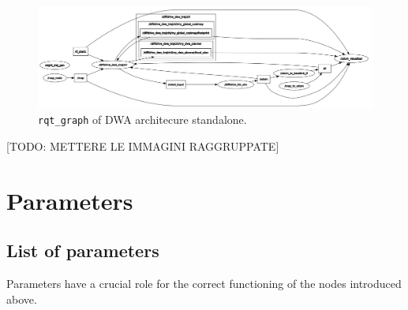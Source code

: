 \documentclass[11pt,a4paper]{article}
\begin{document}
\begin{figure}[H]
    \centering
    \includegraphics[scale=0.25]{ros_tools/rqtgraph_dwa.png}
    \caption{\texttt{rqt\_graph} of DWA architecure standalone.}
\end{figure}

[TODO: METTERE LE IMMAGINI RAGGRUPPATE]



\section{Parameters}

\subsection{List of parameters}

Parameters have a crucial role for the correct functioning of the nodes introduced above.\\
\end{document}
